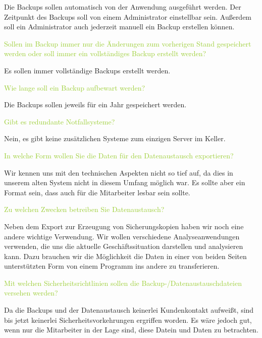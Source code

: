 \textcolor{NavyBlue}{Die Backups sollen automatisch von der Anwendung ausgeführt werden. Der Zeitpunkt des Backups soll von einem Administrator einstellbar sein. Außerdem soll ein Administrator auch jederzeit manuell ein Backup erstellen können.}

\textcolor{YellowGreen}{Sollen im Backup immer nur die Änderungen zum vorherigen Stand gespeichert werden oder soll immer ein vollständiges Backup erstellt werden?}

\textcolor{NavyBlue}{Es sollen immer vollständige Backups erstellt werden.}

\textcolor{YellowGreen}{Wie lange soll ein Backup aufbewart werden?}

\textcolor{NavyBlue}{Die Backups sollen jeweils für ein Jahr gespeichert werden.}



\textcolor{YellowGreen}{Gibt es redundante Notfallsysteme?}

\textcolor{NavyBlue}{Nein, es gibt keine zusätzlichen Systeme zum einzigen Server im Keller.}

\textcolor{YellowGreen}{In welche Form wollen Sie die Daten für den Datenaustausch exportieren?}

\textcolor{NavyBlue}{Wir kennen uns mit den technischen Aspekten nicht so tief auf, da dies in unserem alten System nicht in diesem Umfang möglich war. Es sollte aber ein Format sein, dass auch für die Mitarbeiter lesbar sein sollte.}

\textcolor{YellowGreen}{Zu welchen Zwecken betreiben Sie Datenaustausch?}

\textcolor{NavyBlue}{Neben dem Export zur Erzeugung von Sicherungskopien haben wir noch eine andere wichtige Verwendung. Wir wollen verschiedene Analyseanwendungen verwenden, die uns die aktuelle Geschäftssituation darstellen und analysieren kann. Dazu brauchen wir die Möglichkeit die Daten in einer von beiden Seiten unterstützten Form von einem Programm ins andere zu transferieren.}

\textcolor{YellowGreen}{Mit welchen Sicherheitsrichtlinien sollen die Backup-/Datenaustauschdateien versehen werden?}

\textcolor{NavyBlue}{Da die Backups und der Datenaustausch keinerlei Kundenkontakt aufweißt, sind bis jetzt keinerlei Sicherheitsvorkehrungen ergriffen worden. Es wäre jedoch gut, wenn nur die Mitarbeiter in der Lage sind, diese Datein und Daten zu betrachten.}

